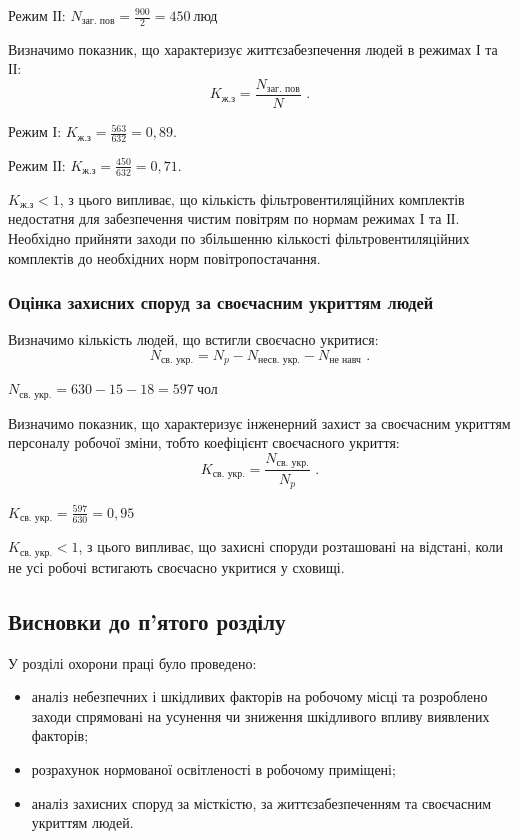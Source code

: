 \documentclass[a4paper,ukrainian,utf8,nocolumnsxix,nocolumnxxxii,nocolumnxxxi,floatsection,equationsection]{eskdtext}
\renewcommand\paragraph{\subsubsection}
\begin{document}
Режим ІІ: $N_\text{заг. пов} = \frac{900}{2} = 450 \:\text{люд}$

Визначимо показник, що характеризує життєзабезпечення людей в режимах І та ІІ:
\begin{equation}
	K_\text{ж.з} = \frac{N_\text{заг. пов}}{N} \text{ .}
\end{equation}

Режим І: $K_\text{ж.з} = \frac{563}{632} = 0,89$.

Режим ІІ: $K_\text{ж.з} = \frac{450}{632} = 0,71$.

$K_\text{ж.з} < 1$, з цього випливає, що кількість фільтровентиляційних комплектів недостатня для забезпечення чистим повітрям по нормам режимах І та ІІ. Необхідно прийняти заходи по збільшенню кількості фільтровентиляційних комплектів до необхідних норм повітропостачання.

\paragraph{Оцінка захисних споруд за своєчасним укриттям людей}

Визначимо кількість людей, що встигли своєчасно укритися:
\begin{equation}
	N_\text{св. укр.} = N_p - N_\text{несв. укр.} - N_\text{не навч} \text{ .}
\end{equation}

$N_\text{св. укр.} = 630 - 15 - 18 = 597 \:\text{чол}$

Визначимо показник, що характеризує інженерний захист за своєчасним укриттям персоналу робочої зміни, тобто коефіцієнт своєчасного укриття:
\begin{equation}
	K_\text{св. укр.} = \frac{N_\text{св. укр.}}{N_p} \text{ .}
\end{equation}

$K_\text{св. укр.} = \frac{597}{630} = 0,95$

$K_\text{св. укр.} < 1$, з цього випливає, що захисні споруди розташовані на відстані, коли не усі робочі встигають своєчасно укритися у сховищі.

\subsection{Висновки до п'ятого розділу}

У розділі охорони праці було проведено:

\begin{itemize}
	\item аналіз небезпечних і шкідливих факторів на робочому місці та розроблено заходи спрямовані на усунення чи зниження шкідливого впливу виявлених факторів;
	\item розрахунок нормованої освітленості в робочому приміщені;
	\item аналіз захисних споруд за місткістю, за життєзабезпеченням та своєчасним укриттям людей. 
\end{itemize}
\end{document}
